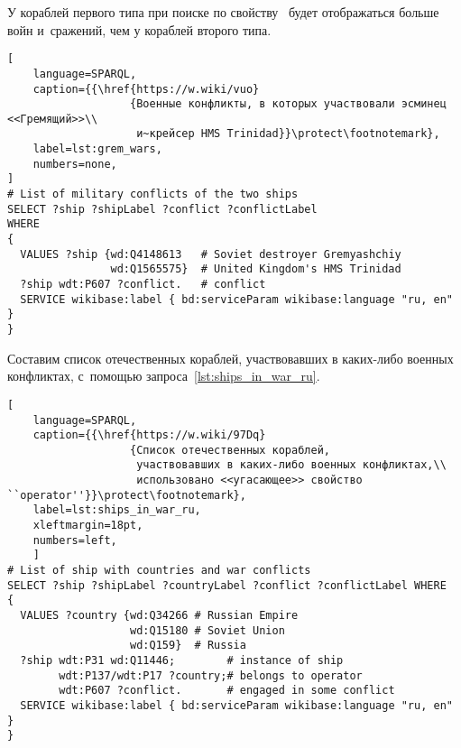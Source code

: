 У кораблей первого типа при поиске по свойству~ 
будет отображаться больше войн и~сражений, чем у кораблей второго типа. 


\begin{lstlisting}[ 
    language=SPARQL, 
    caption={{\href{https://w.wiki/vuo}
                   {Военные конфликты, в которых участвовали эсминец <<Гремящий>>\\
                    и~крейсер HMS Trinidad}}\protect\footnotemark}, 
    label=lst:grem_wars, 
    numbers=none,
]
# List of military conflicts of the two ships 
SELECT ?ship ?shipLabel ?conflict ?conflictLabel
WHERE
{
  VALUES ?ship {wd:Q4148613   # Soviet destroyer Gremyashchiy
                wd:Q1565575}  # United Kingdom's HMS Trinidad
  ?ship wdt:P607 ?conflict.   # conflict
  SERVICE wikibase:label { bd:serviceParam wikibase:language "ru, en" }
}
\end{lstlisting}




Составим список отечественных кораблей, 
участвовавших в каких-либо военных конфликтах, 
с~помощью запроса~\ref{lst:ships_in_war_ru}.

\newpage
\begin{lstlisting}[ 
    language=SPARQL, 
    caption={{\href{https://w.wiki/97Dq}
                   {Список отечественных кораблей, 
                    участвовавших в каких-либо военных конфликтах,\\
                    использовано <<угасающее>> свойство ``operator''}}\protect\footnotemark}, 
    label=lst:ships_in_war_ru,
    xleftmargin=18pt, 
    numbers=left,
    ]
# List of ship with countries and war conflicts
SELECT ?ship ?shipLabel ?countryLabel ?conflict ?conflictLabel WHERE
{
  VALUES ?country {wd:Q34266 # Russian Empire
                   wd:Q15180 # Soviet Union
                   wd:Q159}  # Russia
  ?ship wdt:P31 wd:Q11446;        # instance of ship
        wdt:P137/wdt:P17 ?country;# belongs to operator
        wdt:P607 ?conflict.       # engaged in some conflict
  SERVICE wikibase:label { bd:serviceParam wikibase:language "ru, en" }
}
\end{lstlisting}

